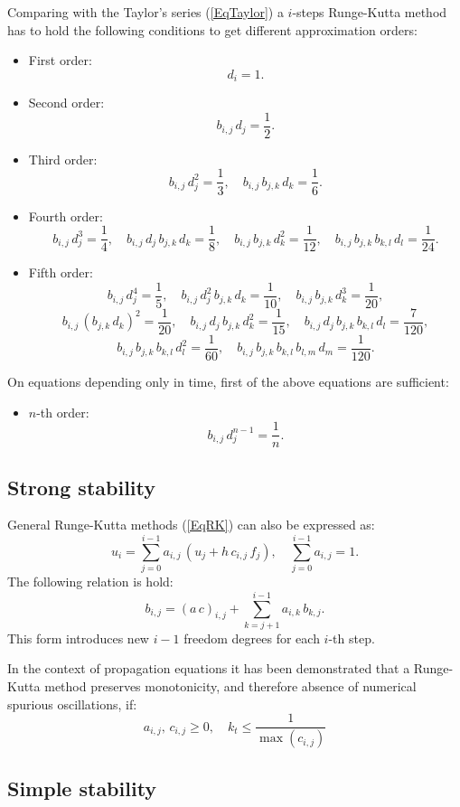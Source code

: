 \documentclass[a4paper]{article}
\newcommand{\EQ}[2]{\begin{equation}#1\label{#2}\end{equation}}
\newcommand{\PA}[1]{\left(#1\right)}
\begin{document}
Comparing with the Taylor's series (\ref{EqTaylor}) a $i$-steps Runge-Kutta
method has to hold the following conditions to get different approximation
orders:
\begin{itemize}
\item First order:
	\EQ{d_i=1.}{EqRKI}
\item Second order:
	\EQ{b_{i,j}\,d_j=\frac12.}{EqRKII}
\item Third order:
	\EQ
	{
		b_{i,j}\,d_j^2=\frac13,\quad
		b_{i,j}\,b_{j,k}\,d_k=\frac16.
	}{EqRKIII}
\item Fourth order:
	\EQ
	{
		b_{i,j}\,d_j^3=\frac14,\quad
		b_{i,j}\,d_j\,b_{j,k}\,d_k=\frac18,\quad
		b_{i,j}\,b_{j,k}\,d_k^2=\frac1{12},\quad
		b_{i,j}\,b_{j,k}\,b_{k,l}\,d_l=\frac1{24}.
	}{EqRKIV}
\item Fifth order:
	\[
		b_{i,j}\,d_j^4=\frac15,\quad
		b_{i,j}\,d_j^2\,b_{j,k}\,d_k=\frac1{10},\quad
		b_{i,j}\,b_{j,k}\,d_k^3=\frac1{20},
	\]
	\[
		b_{i,j}\,\PA{b_{j,k}\,d_k}^2=\frac1{20},\quad
		b_{i,j}\,d_j\,b_{j,k}\,d_k^2=\frac1{15},\quad
		b_{i,j}\,d_j\,b_{j,k}\,b_{k,l}\,d_l=\frac7{120},
	\]
	\EQ
	{
		b_{i,j}\,b_{j,k}\,b_{k,l}\,d_l^2=\frac1{60},\quad
		b_{i,j}\,b_{j,k}\,b_{k,l}\,b_{l,m}\,d_m=\frac1{120}.
	}{EqRKV}
\end{itemize}

On equations depending only in time, first of the above equations are
sufficient:
\begin{itemize}
\item $n$-th order:
	\EQ{b_{i,j}\,d_j^{n-1}=\frac1n.}{EqRKt}
\end{itemize}

\subsection{Strong stability}

General Runge-Kutta methods (\ref{EqRK}) can also be expressed as:
\EQ
{
	u_i=\sum_{j=0}^{i-1}a_{i,j}\,\PA{u_j+h\,c_{i,j}\,f_j},\quad
	\sum_{j=0}^{i-1}a_{i,j}=1.
}{EqRKac}
The following relation is hold:
\EQ{b_{i,j}=(a\,c)_{i,j}+\sum_{k=j+1}^{i-1}a_{i,k}\,b_{k,j}.}{EqRKacb}
This form introduces new $i-1$ freedom degrees for each $i$-th step.

In the context of propagation equations it has been demonstrated that a
Runge-Kutta method preserves monotonicity, and therefore absence of numerical
spurious oscillations, if:
\EQ{a_{i,j},\,c_{i,j}\geq0,\quad k_t\leq\frac1{\max\PA{c_{i,j}}}}{EqRKTVD}

\subsection{Simple stability}
\end{document}
